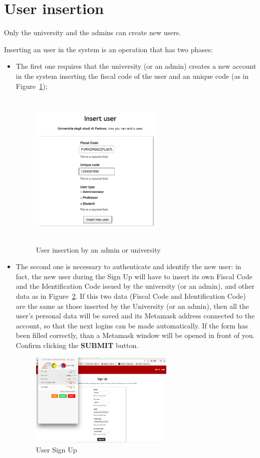 \section{User insertion}
Only the university and the admins can create new users.

Inserting an user in the system is an operation that has two phases: 
\begin{itemize}
\item The first one requires that the university (or an admin) creates a new account in the system inserting the fiscal code of the user and an unique code (as in Figure~\ref{fig:userInsertionAdmin});
\begin{figure}[!h]
	\centering
	\includegraphics[width=0.60\textwidth, height=3in]{img/userInsertionAdmin.png}
	\caption{User insertion by an admin or university}
	\label{fig:userInsertionAdmin}
\end{figure}

\item The second one is necessary to authenticate and identify the new user: in fact, the  new user during the Sign Up will have to insert its own Fiscal Code and the Identification Code issued by the university (or an admin), and other data as in Figure~\ref{fig:stdSignUp}. If this two data (Fiscal Code and Identification Code) are the same as those inserted by the University (or an admin), then all  the user's personal data will be saved and its Metamask address connected to the account, so that the next logins can be made automatically.
If the form has been filled correctly, than a Metamask window will be opened in front of you. Confirm clicking the \textbf{SUBMIT} button.
\begin{figure}[!h]
	\centering
	\includegraphics[width=0.65\textwidth]{img/studentInsertion.png}
	\caption{User Sign Up}
	\label{fig:stdSignUp}
\end{figure}
\end{itemize}
